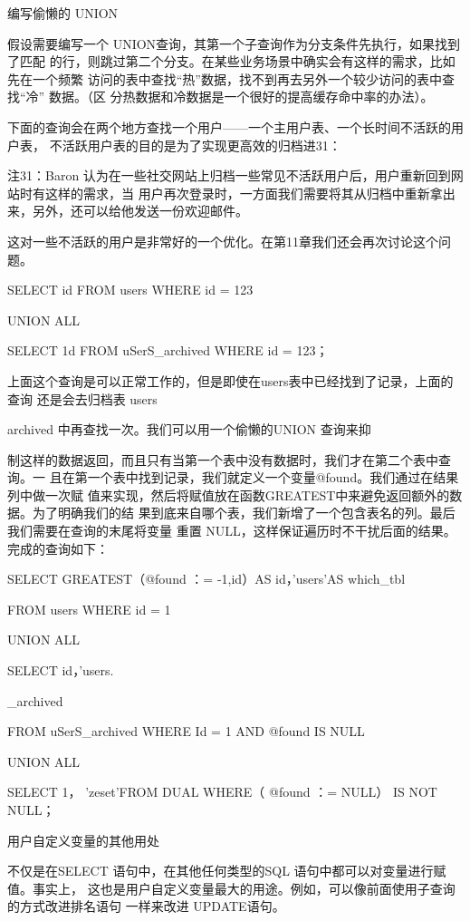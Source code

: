 编写偷懒的 UNION

假设需要编写一个 UNION查询，其第一个子查询作为分支条件先执行，如果找到了匹配
的行，则跳过第二个分支。在某些业务场景中确实会有这样的需求，比如先在一个频繁
访问的表中查找“热”数据，找不到再去另外一个较少访问的表中查找“冷” 数据。（区
分热数据和冷数据是一个很好的提高缓存命中率的办法）。

下面的查询会在两个地方查找一个用户——一个主用户表、一个长时间不活跃的用户表，
不活跃用户表的目的是为了实现更高效的归档进31：

注31：Baron 认为在一些社交网站上归档一些常见不活跃用户后，用户重新回到网站时有这样的需求，当
用户再次登录时，一方面我们需要将其从归档中重新拿出来，另外，还可以给他发送一份欢迎邮件。

这对一些不活跃的用户是非常好的一个优化。在第11章我们还会再次讨论这个问题。

SELECT id FROM users WHERE id = 123

UNION ALL

SELECT 1d FROM uSerS\_archived WHERE id = 123；

上面这个查询是可以正常工作的，但是即使在users表中已经找到了记录，上面的查询
还是会去归档表 users

archived 中再查找一次。我们可以用一个偷懒的UNION 查询来抑

制这样的数据返回，而且只有当第一个表中没有数据时，我们才在第二个表中查询。一
且在第一个表中找到记录，我们就定义一个变量@found。我们通过在结果列中做一次赋
值来实现，然后将赋值放在函数GREATEST中来避免返回额外的数据。为了明确我们的结
果到底来自哪个表，我们新增了一个包含表名的列。最后我们需要在查询的末尾将变量
重置 NULL，这样保证遍历时不干扰后面的结果。完成的查询如下：

SELECT GREATEST（@found ：= -1,id）AS id，'users'AS which\_tbl

FROM users WHERE id = 1

UNION ALL

SELECT id，'users.

\_archived

FROM uSerS\_archived WHERE Id = 1 AND @found IS NULL

UNION ALL

SELECT 1， 'zeset'FROM DUAL WHERE（ @found ：= NULL） IS NOT NULL；

用户自定义变量的其他用处

不仅是在SELECT 语句中，在其他任何类型的SQL 语句中都可以对变量进行赋值。事实上，
这也是用户自定义变量最大的用途。例如，可以像前面使用子查询的方式改进排名语句
一样来改进 UPDATE语句。

